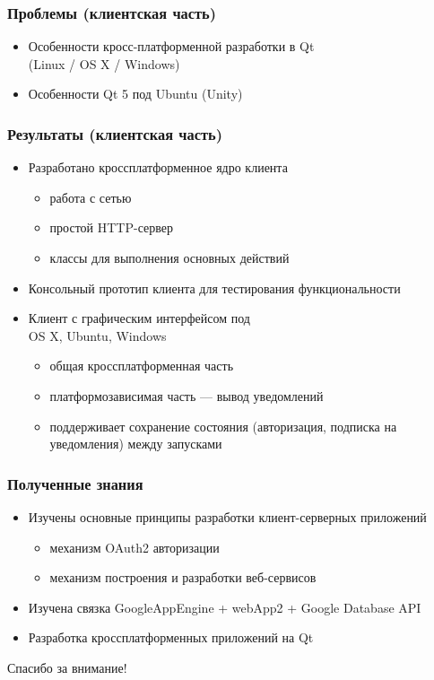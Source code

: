 \documentclass[10pt,pdf,hyperref={unicode}]{beamer}
\begin{document}
    \begin{frame}\frametitle{Проблемы (клиентская часть)}
        \begin{itemize}%
            \item Особенности кросс-платформенной разработки в Qt \\
            (Linux / OS X / Windows)
            \item Особенности Qt 5 под Ubuntu (Unity)
        \end{itemize}
    \end{frame}
    
    \begin{frame}\frametitle{Результаты (клиентская часть)}
        \begin{itemize}%
            \item Разработано кроссплатформенное ядро клиента            	
            \begin{itemize}
                \item работа с сетью
                \item простой HTTP-сервер
                \item классы для выполнения основных действий
            \end{itemize}
            \pause
            \item Консольный прототип клиента для тестирования функциональности
            \pause
            \item Клиент с графическим интерфейсом под \\ OS X, Ubuntu, Windows
            \begin{itemize}
                \item общая кроссплатформенная часть
                \item платформозависимая часть --- вывод уведомлений
                \item поддерживает сохранение состояния (авторизация, подписка
                на уведомления) между запусками
            \end{itemize}
        \end{itemize}
    \end{frame}

    \begin{frame}\frametitle{Полученные знания}
        \begin{itemize}%
            \item	Изучены основные принципы разработки клиент-серверных приложений
            \begin{itemize}
                \item механизм OAuth2 авторизации
                \item механизм построения и разработки веб-сервисов
            \end{itemize}            
            \item	Изучена связка GoogleAppEngine + webApp2 + Google Database API
            \item	Разработка кроссплатформенных приложений на Qt
        \end{itemize}
    \end{frame}

    \begin{frame}
        \begin{center}
            Спасибо за внимание!
        \end{center}
    \end{frame}
\end{document}

